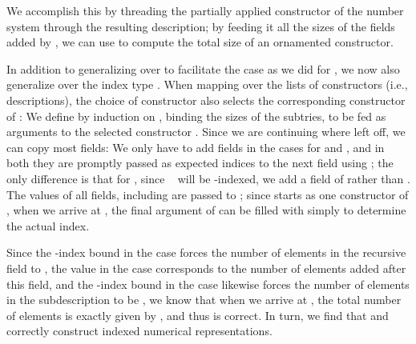We accomplish this by threading the partially applied constructor  of the number system  through the resulting description; by feeding it all the sizes of the fields added by , we can use  to compute the total size of an ornamented constructor.

In addition to generalizing over  to facilitate the  case as we did for , we now also generalize over the index type . When mapping over the lists of constructors (i.e., descriptions), the choice of constructor also selects the corresponding constructor of :
We define  by induction on , binding the sizes of the subtries, to be fed as arguments to the selected constructor . Since we are continuing where  left off, we can copy most fields:
We only have to add fields in the cases for  and , and in both they are promptly passed as expected indices to the next field using ; the only difference is that for , since \  will be -indexed, we add a field of  rather than . The values of all fields, including  are passed to ; since  starts as one constructor  of , when we arrive at , the final argument of  can be filled with simply  to determine the actual index.

Since the -index  bound in the  case forces the number of elements in the recursive field to , the value in the  case corresponds to the number of elements added after this field, and the -index  bound in the  case likewise forces the number of elements in the subdescription to be , we know that when we arrive at , the total number of elements is exactly given by , and thus  is correct. In turn, we find that  and  correctly construct indexed numerical representations.

